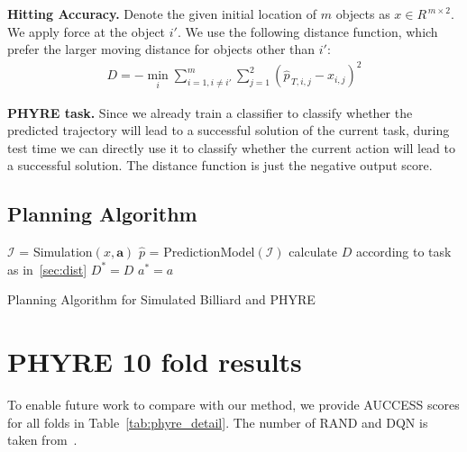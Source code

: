 \documentclass{article} \usepackage{iclr2021_conference,times}
\newcommand{\numoutput}{T}
\newcommand{\numobj}{m}
\begin{document}
\textbf{Hitting Accuracy.} Denote the given initial location of $\numobj$ objects as $x \in R^{\,\numobj \times 2}$. We apply force at the object $i'$. We use the following distance function, which prefer the larger moving distance for objects other than $i'$:
\vspace{-0.8em}
\begin{align}
D = -\min_{i}{\sum_{i=1,i\neq i'}^{\numobj}\sum_{j=1}^{2}(\hat{p}_{\, \numoutput, i, j} - x_{i,j}) ^2}
\end{align}
\vspace{-0.8em}

\textbf{PHYRE task.} 
Since we already train a classifier to classify whether the predicted trajectory will lead to a successful solution of the current task, during test time we can directly use it to classify whether the current action will lead to a successful solution. The distance function is just the negative output score.

\subsection{Planning Algorithm}

\begin{algorithm}[H]
\SetAlgoLined
{}
 {
  $\mathcal{I}$ = Simulation$(x, \mathbf{a})$ \;
  $\hat{p}$ = PredictionModel$(\mathcal{I})$ \;
  calculate $D$ according to task as in~\ref{sec:dist}\;
   {
    $D^{*} = D$ \;
    $a^{*} = a$ \;
  }
}
\caption{Planning Algorithm for Simulated Billiard and PHYRE}
\label{alg:plan}
\end{algorithm}

\section{PHYRE 10 fold results}

To enable future work to compare with our method, we provide AUCCESS scores for all folds in Table~\ref{tab:phyre_detail}. The number of RAND and DQN is taken from~\citet{bakhtin2019phyre}.
\end{document}
